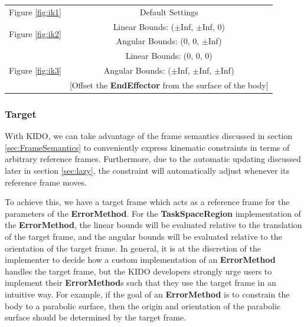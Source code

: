 \begin{tabular}{| l | c |}
  \hline
  \multirow{2}{*}{Figure \ref{fig:ik1}} & \multirow{2}{*}{Default Settings}              \\
                                        &                                                \\ \hline
  \multirow{2}{*}{Figure \ref{fig:ik2}} & Linear Bounds: ($\pm$Inf, $\pm$Inf, 0)         \\
                                        & Angular Bounds: (0, 0, $\pm$Inf)               \\ \hline
  \multirow{3}{*}{Figure \ref{fig:ik3}} & Linear Bounds: (0, 0, 0)                       \\
                                        & Angular Bounds: ($\pm$Inf, $\pm$Inf, $\pm$Inf) \\
                                        & [Offset the \textbf{EndEffector} from the surface of the body]     \\ \hline
\end{tabular}

\subsubsection{Target}

With KIDO, we can take advantage of the frame semantics discussed in section \ref{sec:FrameSemantics} to conveniently express kinematic constraints in terms of arbitrary reference frames. Furthermore, due to the automatic updating discussed later in section \ref{sec:lazy}, the constraint will automatically adjust whenever its reference frame moves.

To achieve this, we have a target frame which acts as a reference frame for the parameters of the \textbf{ErrorMethod}. For the \textbf{TaskSpaceRegion} implementation of the \textbf{ErrorMethod}, the linear bounds will be evaluated relative to the translation of the target frame, and the angular bounds will be evaluated relative to the orientation of the target frame. In general, it is at the discretion of the implementer to decide how a custom implementation of an \textbf{ErrorMethod} handles the target frame, but the KIDO developers strongly urge users to implement their \textbf{ErrorMethod}s such that they use the target frame in an intuitive way. For example, if the goal of an \textbf{ErrorMethod} is to constrain the body to a parabolic surface, then the origin and orientation of the parabolic surface should be determined by the target frame.

